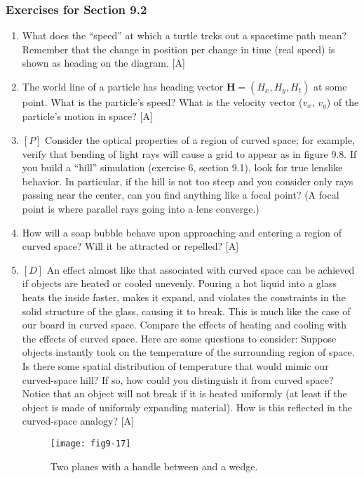 \documentclass{book}
\begin{document}
\subsubsection{Exercises for Section 9.2}
\begin{enumerate}
\item What does the ``speed'' at which a turtle treks out a spacetime path
mean? Remember that the change in position per change in time (real
speed) is shown as heading on the diagram. [A]

\item The world line of a particle has heading vector $\mathbf{H} = (H_x, H_y, H_t)$ at
some point. What is the particle's speed? What is the velocity vector
($v_x$, $v_y$) of the particle's motion in space? [A]

\item $[P]$ Consider the optical properties of a region of curved space; for
example, verify that bending of light rays will cause a grid to appear as
in figure 9.8. If you build a ``hill'' simulation (exercise 6, section 9.1),
look for true lenslike behavior. In particular, if the hill is not too steep
and you consider only rays passing near the center, can you find anything
like a focal point? (A focal point is where parallel rays going into a lens
converge.)

\item How will a soap bubble behave upon approaching and entering a
region of curved space? Will it be attracted or repelled? [A]

\item $[D]$ An effect almost like that associated with curved space can be
achieved if objects are heated or cooled unevenly. Pouring a hot liquid
into a glass heats the inside faster, makes it expand, and violates the
constraints in the solid structure of the glass, causing it to break. This
is much like the case of our board in curved space. Compare the effects
of heating and cooling with the effects of curved space. Here are some
questions to consider: Suppose objects instantly took on the temperature
of the surrounding region of space. Is there some spatial distribution of
temperature that would mimic our curved-space hill? If so, how could
you distinguish it from curved space? Notice that an object will not
break if it is heated uniformly (at least if the object is made of uniformly
expanding material). How is this reflected in the curved-space analogy?
[A]

\begin{figure}
\begin{center}
\texttt{[image: fig9-17]}
\caption{Two planes with a handle between and a wedge.}
\end{center}
\end{figure}


\end{enumerate}
\end{document}
